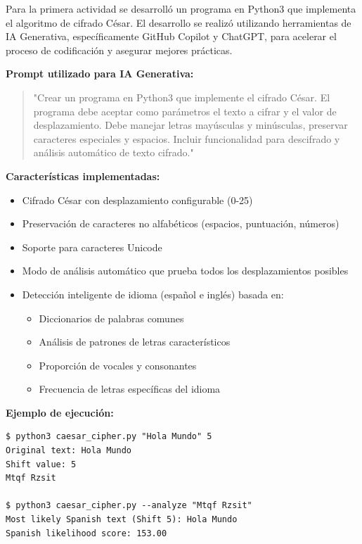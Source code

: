 \documentclass[letter,12pt]{article}
\begin{document}
Para la primera actividad se desarrolló un programa en Python3 que implementa el algoritmo de cifrado César. El desarrollo se realizó utilizando herramientas de IA Generativa, específicamente GitHub Copilot y ChatGPT, para acelerar el proceso de codificación y asegurar mejores prácticas.

\textbf{Prompt utilizado para IA Generativa:}
\begin{quote}
"Crear un programa en Python3 que implemente el cifrado César. El programa debe aceptar como parámetros el texto a cifrar y el valor de desplazamiento. Debe manejar letras mayúsculas y minúsculas, preservar caracteres especiales y espacios. Incluir funcionalidad para descifrado y análisis automático de texto cifrado."
\end{quote}

\textbf{Características implementadas:}
\begin{itemize}
    \item Cifrado César con desplazamiento configurable (0-25)
    
    \item Preservación de caracteres no alfabéticos (espacios, puntuación, números)
    
    \item Soporte para caracteres Unicode
    
    \item Modo de análisis automático que prueba todos los desplazamientos posibles
    
    \item Detección inteligente de idioma (español e inglés) basada en:
    \begin{itemize}
        \item Diccionarios de palabras comunes
        
        \item Análisis de patrones de letras característicos
        
        \item Proporción de vocales y consonantes
        
        \item Frecuencia de letras específicas del idioma
    \end{itemize}
\end{itemize}

\textbf{Ejemplo de ejecución:}
\begin{verbatim}
$ python3 caesar_cipher.py "Hola Mundo" 5
Original text: Hola Mundo
Shift value: 5
Mtqf Rzsit

$ python3 caesar_cipher.py --analyze "Mtqf Rzsit"
Most likely Spanish text (Shift 5): Hola Mundo
Spanish likelihood score: 153.00
\end{verbatim}
\end{document}
